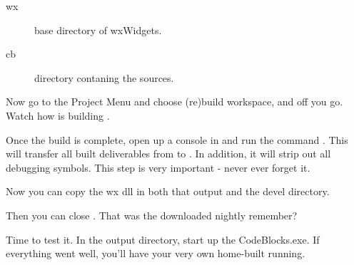 \begin{description}
\item[wx]  base directory of wxWidgets.
\item[cb]  \codeblocks directory contaning the sources.
\end{description}

Now go to the Project Menu and choose (re)build workspace, and off you go. Watch how \codeblocks is building \codeblocks.

Once the build is complete, open up a console in  and run the command . This will transfer all built deliverables from  to . In addition, it will strip out all debugging symbols. This step is very important - never ever forget it.

Now you can copy the wx dll in both that output and the devel directory.

Then you can close \codeblocks. That was the downloaded nightly remember?

Time to test it. In the output directory, start up the CodeBlocks.exe. If everything went well, you'll have your very own home-built \codeblocks running.
